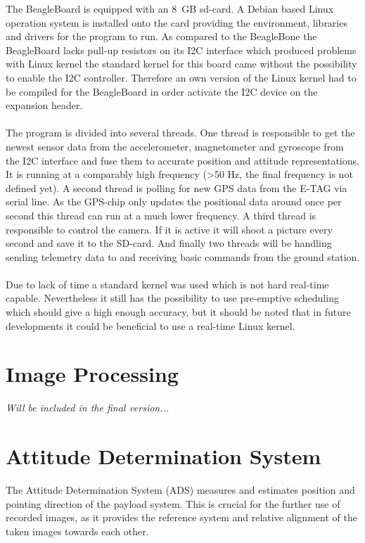 The BeagleBoard is equipped with an 8~GB sd-card. A Debian based Linux
operation system is installed onto the card providing the environment,
libraries and drivers for the program to run. As compared to the BeagleBone the
BeagleBoard lacks pull-up resistors on its I2C interface which produced
problems with Linux kernel the standard kernel for this board came without the
possibility to enable the I2C controller. Therefore an own version of the Linux
kernel had to be compiled for the BeagleBoard in order activate the I2C device
on the expansion header. 
\\
\\
The program is divided into several threads. One thread is responsible to get
the newest sensor data from the accelerometer, magnetometer and gyroscope
from the I2C interface and fuse them to accurate position and attitude
representations. It is running at a comparably high frequency (>50 Hz, the final
frequency is not defined yet).  A second thread is polling for new GPS data from
the E-TAG via serial line. As the GPS-chip only updates the positional data
around once per second this thread can run at a much lower frequency.
A third thread is responsible to control the camera. If it is active it will
shoot a picture every second and save it to the SD-card. And finally two
threads will be handling sending telemetry data to and receiving basic commands
from the ground station.
\\
\\
Due to lack of time a standard kernel was used which is not hard real-time
capable. Nevertheless it still has the possibility to use pre-emptive scheduling
which should give a high enough accuracy, but it should be noted that in future
developments it could be beneficial to use a real-time Linux kernel. 

\FloatBarrier
\section{Image Processing}

\textit{Will be included in the final version...}

\FloatBarrier
\section{Attitude Determination System}

The Attitude Determination System (ADS) measures and estimates position and pointing direction of the payload system.
This is crucial for the further use of recorded images, as it provides the reference system and relative alignment of the taken images towards each other.

